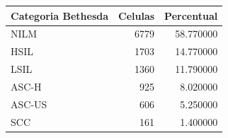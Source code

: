 \begin{tabular}{lrr}
\toprule
Categoria Bethesda & Celulas & Percentual \\
\midrule
NILM & 6779 & 58.770000 \\
HSIL & 1703 & 14.770000 \\
LSIL & 1360 & 11.790000 \\
ASC-H & 925 & 8.020000 \\
ASC-US & 606 & 5.250000 \\
SCC & 161 & 1.400000 \\
\bottomrule
\end{tabular}
